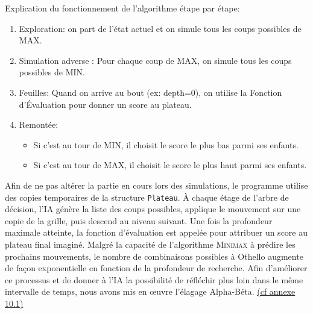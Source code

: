 \documentclass{article}
\begin{document}
Explication du fonctionnement de l'algorithme étape par étape: 
\begin{enumerate}
\item Exploration: on part de l'état actuel et on simule tous les coups possibles de MAX.
\item Simulation adverse : Pour chaque coup de MAX, on simule tous les coups possibles de MIN.
\item Feuilles: Quand on arrive au bout (ex: depth=0), on utilise la Fonction d'Évaluation pour donner un score au plateau.
\item Remontée:
\begin{itemize}
\item Si c'est au tour de MIN, il choisit le score le plus bas parmi ses enfants.
\item Si c'est au tour de MAX, il choisit le score le plus haut parmi ses enfants.
\end{itemize}
\end{enumerate}
Afin de ne pas altérer la partie en cours lors des simulations, le programme utilise des copies temporaires de la structure \texttt{Plateau}. À chaque étage de l'arbre de décision, l'IA génère la liste des coups possibles, applique le mouvement sur une copie de la grille, puis descend au niveau suivant. Une fois la profondeur maximale atteinte, la fonction d'évaluation est appelée pour attribuer un score au plateau final imaginé.
\medskip
Malgré la capacité de l'algorithme \textsc{Minimax} à prédire les prochains mouvements, le nombre de combinaisons possibles à Othello augmente de façon exponentielle en fonction de la profondeur de recherche. Afin d'améliorer ce processus et de donner à l'IA la possibilité de réfléchir plus loin dans le même intervalle de temps, nous avons mis en œuvre l'élagage Alpha-Béta. \hyperref[alg:minimax]{(cf annexe 10.1)}
\end{document}
